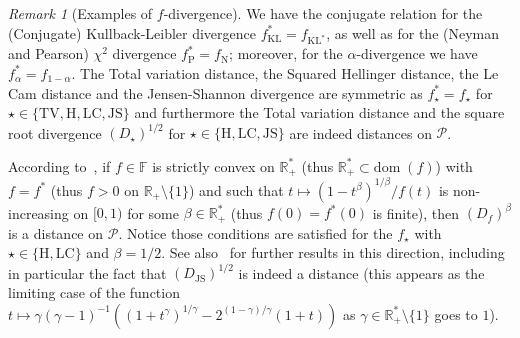 \documentclass[12pt]{article}
\newcommand{\cp}{{\mathcal P}}
\newcommand{\F}{{\mathbb F}}
\newcommand{\R}{{\mathbb R}}
\newcommand{\dom}{{\mathrm{dom}}\;}
\theoremstyle{plain}
\theoremstyle{remark}
\newtheorem{rem}{Remark}
\begin{document}
\begin{rem}[Examples of $f$-divergence]
We  have the  conjugate  relation for  the (Conjugate)  Kullback-Leibler
divergence  $f_\mathrm{KL}^*= f_{\mathrm{KL}^*}$, as well as  for  the (Neyman  and
Pearson)  $\chi^2$ divergence  $f_\mathrm{P}^*=  f_\mathrm{N}$; moreover, for  the
$\alpha$-divergence we have $f_\alpha^*=f_{1-\alpha}$.    The  Total  variation
distance, the  Squared Hellinger distance,  the Le Cam distance  and the
Jensen-Shannon  divergence  are  symmetric  as  $f_\star^*=f_\star$  for
$\star\in  \{\mathrm{TV},  \mathrm{H}, \mathrm{LC},  \mathrm{JS}\}$  and
furthermore the Total variation distance  and the square root divergence
$(D_{\star})^{1/2}$                                                    for
$\star\in   \{  \mathrm{H},   \mathrm{LC},  \mathrm{JS}\}$   are  indeed
distances       on       $\cp$.

According       to~\citet[Theorem~1
and~2]{kafka1991powers},  if $f\in  \F$ is  strictly convex  on $\R_+^*$
(thus   $\R_+^*  \subset   \dom(f)$)   with  $f=f^*$   (thus  $f>0$   on
$\R_+\setminus\{1\}$)             and              such             that
$t\mapsto (1-  t^\beta)^{1/\beta}/ f(t)$  is non-increasing on  $[0, 1)$
for  some  $\beta\in  \R_+^*$   (thus  $f(0)=f^*(0)$  is  finite),  then
$(D_f)^{\beta}$  is a  distance  on $\cp$.   Notice  those conditions  are
satisfied for the $f_\star$ with $\star\in \{ \mathrm{H}, \mathrm{LC}\}$
and  $\beta=1/2$. See  also~\cite{ov:2003}  for further  results in  this
direction, including in particular the fact that $(D_{\mathrm{JS}})^{1/2}$
is   indeed  a   distance  (this   appears   as  the   limiting  case   of the function
$t\mapsto \gamma(  \gamma -1)^{-1} \left(  (1+t^\gamma)^{1/\gamma}  - 2^{(1-\gamma)/\gamma}
(1+t)\right)$ as $\gamma\in \R_+^*\setminus\{1\}$ goes to $1$).
\end{rem}
\end{document}
